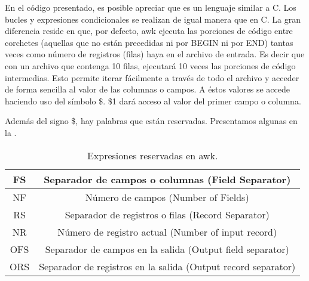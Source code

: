 En el código presentado, es posible apreciar que es un lenguaje similar a C. Los bucles y expresiones condicionales se realizan de igual manera que en C. La gran diferencia reside en que, por defecto, awk ejecuta las porciones de código entre corchetes (aquellas que no están precedidas ni por BEGIN ni por END) tantas veces como número de registros (filas) haya en el archivo de entrada. Es decir que con un archivo que contenga 10 filas, ejecutará 10 veces las porciones de código intermedias. Esto permite iterar fácilmente a través de todo el archivo y acceder de forma sencilla al valor de las columnas o campos. A éstos valores se accede haciendo uso del símbolo \$. \$1 dará acceso al valor del primer campo o columna.

Además del signo \$, hay palabras que están reservadas. Presentamos algunas en la .
\begin{table}[htp]
\begin{center}
\begin{tabular}{*{2}{c}}
\hline
FS&	Separador de campos o columnas (Field Separator)\\ \hline
NF&	Número de campos (Number of Fields)\\ \hline
RS&	Separador de registros o filas (Record Separator)\\ \hline
NR&	Número de registro actual (Number of input record)\\ \hline
OFS&	Separador de campos en la salida (Output field separator)\\ \hline
ORS&	Separador de registros en la salida (Output record separator)\\ \hline
\end{tabular}
\end{center}
\caption[Expresiones reservadas en awk]{Expresiones reservadas en awk.}
\label{AC:tbl:awkReserved}
\end{table}